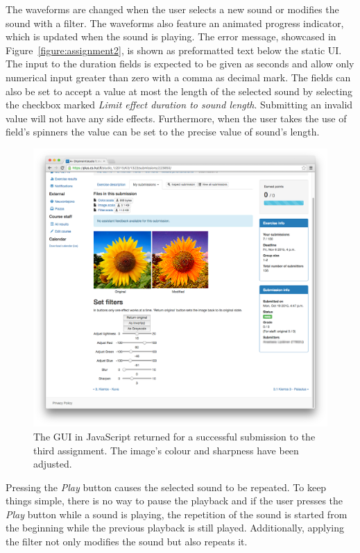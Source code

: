 The waveforms are changed when the user selects a new sound or modifies the sound with a filter. The waveforms also feature an animated progress indicator, which is updated when the sound is playing. The error message, showcased in Figure~\ref{figure:assignment2}, is shown as preformatted text below the static UI. The input to the duration fields is expected to be given as seconds and allow only numerical input greater than zero with a comma as decimal mark. The fields can also be set to accept a value at most the length of the selected sound by selecting the checkbox marked \emph{Limit effect duration to sound length}. Submitting an invalid value will not have any side effects. Furthermore, when the user takes the use of field's spinners the value can be set to the precise value of sound's length.

\begin{figure}[!hb]
	\begin{center}
		\includegraphics[width=\textwidth]{images/assignment3-mod.png}
	\end{center}
	\caption[asdf]{\small{The GUI in JavaScript returned for a successful submission to the third assignment. The image's colour and sharpness have been adjusted.}}
	\label{figure:assignment3}
\end{figure}

Pressing the \emph{Play} button causes the selected sound to be repeated. To keep things simple, there is no way to pause the playback and if the user presses the \emph{Play} button while a sound is playing, the repetition of the sound is started from the beginning while the previous playback is still played. Additionally, applying the filter not only modifies the sound but also repeats it.

